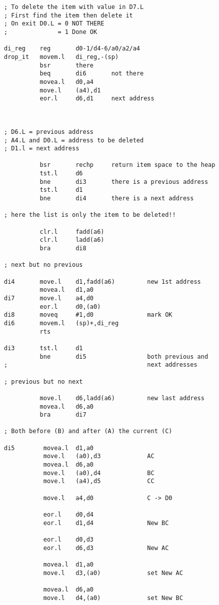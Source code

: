 \begin{lstlisting}[firstnumber=1,caption={George's Linked List Example Program}]
; To delete the item with value in D7.L
; First find the item then delete it
; On exit D0.L = 0 NOT THERE
;              = 1 Done OK

di_reg    reg       d0-1/d4-6/a0/a2/a4
drop_it   movem.l   di_reg,-(sp)
          bsr       there
          beq       di6       not there
          movea.l   d0,a4
          move.l    (a4),d1
          eor.l     d6,d1     next address



; D6.L = previous address
; A4.L and D0.L = address to be deleted
; D1.l = next address

          bsr       rechp     return item space to the heap
          tst.l     d6
          bne       di3       there is a previous address
          tst.l     d1
          bne       di4       there is a next address

; here the list is only the item to be deleted!!

          clr.l     fadd(a6)
          clr.l     ladd(a6)
          bra       di8

; next but no previous

di4       move.l    d1,fadd(a6)         new 1st address
          movea.l   d1,a0
di7       move.l    a4,d0
          eor.l     d0,(a0)
di8       moveq     #1,d0               mark OK
di6       movem.l   (sp)+,di_reg
          rts

di3       tst.l     d1
          bne       di5                 both previous and 
;                                       next addresses

; previous but no next

          move.l    d6,ladd(a6)         new last address
          movea.l   d6,a0
          bra       di7

; Both before (B) and after (A) the current (C)

di5        movea.l  d1,a0
           move.l   (a0),d3             AC
           movea.l  d6,a0
           move.l   (a0),d4             BC
           move.l   (a4),d5             CC

           move.l   a4,d0               C -> D0

           eor.l    d0,d4
           eor.l    d1,d4               New BC

           eor.l    d0,d3
           eor.l    d6,d3               New AC

           movea.l  d1,a0
           move.l   d3,(a0)             set New AC

           movea.l  d6,a0
           move.l   d4,(a0)             set New BC


\end{lstlisting}
